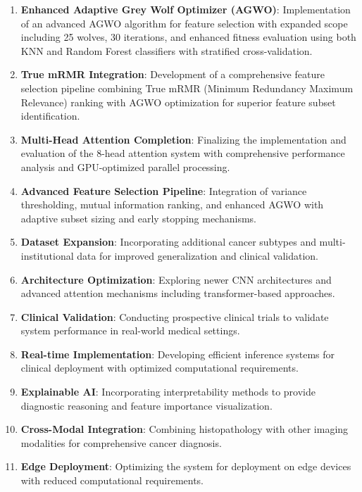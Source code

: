\documentclass[journal]{IEEEtran}
\begin{document}
\begin{enumerate}
    \item \textbf{Enhanced Adaptive Grey Wolf Optimizer (AGWO)}: Implementation of an advanced AGWO algorithm for feature selection with expanded scope including 25 wolves, 30 iterations, and enhanced fitness evaluation using both KNN and Random Forest classifiers with stratified cross-validation.
    
    \item \textbf{True mRMR Integration}: Development of a comprehensive feature selection pipeline combining True mRMR (Minimum Redundancy Maximum Relevance) ranking with AGWO optimization for superior feature subset identification.
    
    \item \textbf{Multi-Head Attention Completion}: Finalizing the implementation and evaluation of the 8-head attention system with comprehensive performance analysis and GPU-optimized parallel processing.
    
    \item \textbf{Advanced Feature Selection Pipeline}: Integration of variance thresholding, mutual information ranking, and enhanced AGWO with adaptive subset sizing and early stopping mechanisms.
    
    \item \textbf{Dataset Expansion}: Incorporating additional cancer subtypes and multi-institutional data for improved generalization and clinical validation.
    
    \item \textbf{Architecture Optimization}: Exploring newer CNN architectures and advanced attention mechanisms including transformer-based approaches.
    
    \item \textbf{Clinical Validation}: Conducting prospective clinical trials to validate system performance in real-world medical settings.
    
    \item \textbf{Real-time Implementation}: Developing efficient inference systems for clinical deployment with optimized computational requirements.
    
    \item \textbf{Explainable AI}: Incorporating interpretability methods to provide diagnostic reasoning and feature importance visualization.
    
    \item \textbf{Cross-Modal Integration}: Combining histopathology with other imaging modalities for comprehensive cancer diagnosis.
    
    \item \textbf{Edge Deployment}: Optimizing the system for deployment on edge devices with reduced computational requirements.
\end{enumerate}
\end{document}
